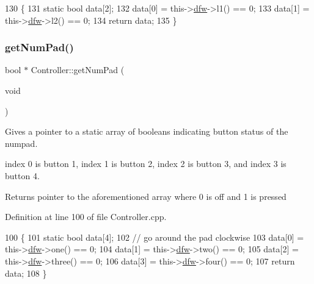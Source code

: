 \begin{DoxyCode}
130                                   \{
131     \textcolor{keyword}{static} \textcolor{keywordtype}{bool} data[2];
132     data[0] = this->\hyperlink{class_controller_af4793ccbf2ecdbfcdb9359bd32b6e8cf}{dfw}->l1() == 0;
133     data[1] = this->\hyperlink{class_controller_af4793ccbf2ecdbfcdb9359bd32b6e8cf}{dfw}->l2() == 0;
134     \textcolor{keywordflow}{return} data;
135 \}
\end{DoxyCode}
\mbox{\label{class_controller_a8429931cf41ef4426057b153f4e4d08a}} 
\subsubsection{\texorpdfstring{get\+Num\+Pad()}{getNumPad()}}
{\footnotesize\ttfamily bool $\ast$ Controller\+::get\+Num\+Pad (\begin{DoxyParamCaption}\item[{void}]{ }\end{DoxyParamCaption})}



Gives a pointer to a static array of booleans indicating button status of the numpad. 

index 0 is button 1, index 1 is button 2, index 2 is button 3, and index 3 is button 4. \begin{DoxyReturn}{Returns}
pointer to the aforementioned array where 0 is off and 1 is pressed 
\end{DoxyReturn}


Definition at line 100 of file Controller.\+cpp.


\begin{DoxyCode}
100                                 \{
101     \textcolor{keyword}{static} \textcolor{keywordtype}{bool} data[4];
102     \textcolor{comment}{// go around the pad clockwise}
103     data[0] = this->\hyperlink{class_controller_af4793ccbf2ecdbfcdb9359bd32b6e8cf}{dfw}->one() == 0;
104     data[1] = this->\hyperlink{class_controller_af4793ccbf2ecdbfcdb9359bd32b6e8cf}{dfw}->two() == 0;
105     data[2] = this->\hyperlink{class_controller_af4793ccbf2ecdbfcdb9359bd32b6e8cf}{dfw}->three() == 0;
106     data[3] = this->\hyperlink{class_controller_af4793ccbf2ecdbfcdb9359bd32b6e8cf}{dfw}->four() == 0;
107     \textcolor{keywordflow}{return} data;
108 \}
\end{DoxyCode}
\mbox{\label{class_controller_afb7906afd8ea451e1f78e337bd22d95b}} 

